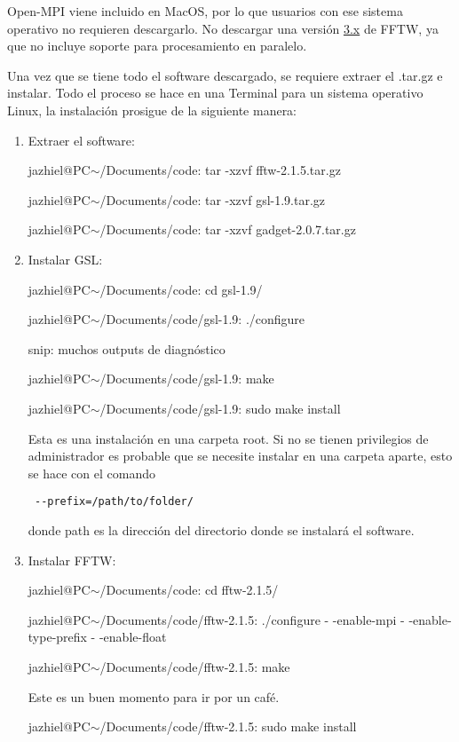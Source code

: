 \documentclass[a4paper,openright,12pt]{book}
\begin{document}
\textsf{Open-MPI} viene incluido en MacOS, por lo que usuarios con ese sistema operativo no requieren descargarlo. No descargar una versión \underline{3.x} de FFTW, ya que no incluye soporte para procesamiento en paralelo.

Una vez que se tiene todo el software descargado, se requiere extraer el \textsf{.tar.gz} e instalar. Todo el proceso se hace en una Terminal para un sistema operativo Linux, la instalación prosigue de la siguiente manera:
\begin{enumerate}
\item Extraer el software:

\textsf{jazhiel@PC$\sim$/Documents/code: tar -xzvf fftw-2.1.5.tar.gz}

\textsf{jazhiel@PC$\sim$/Documents/code: tar -xzvf gsl-1.9.tar.gz}

\textsf{jazhiel@PC$\sim$/Documents/code: tar -xzvf gadget-2.0.7.tar.gz}

\item Instalar GSL:

\textsf{jazhiel@PC$\sim$/Documents/code: cd gsl-1.9/}

\textsf{jazhiel@PC$\sim$/Documents/code/gsl-1.9: ./configure}

\textsf{snip: muchos outputs de diagnóstico}

\textsf{jazhiel@PC$\sim$/Documents/code/gsl-1.9: make}

\textsf{jazhiel@PC$\sim$/Documents/code/gsl-1.9: sudo make install}

Esta es una instalación en una carpeta \textsf{root}. Si no se tienen privilegios de administrador es probable que se necesite instalar en una carpeta aparte, esto se hace con el comando \begin{verbatim} --prefix=/path/to/folder/
\end{verbatim}  donde \textsf{path} es la dirección del directorio donde se instalará el software.

\item Instalar FFTW:

\textsf{jazhiel@PC$\sim$/Documents/code: cd fftw-2.1.5/}

\textsf{jazhiel@PC$\sim$/Documents/code/fftw-2.1.5: ./configure - -enable-mpi - -enable-type-prefix - -enable-float}

\textsf{jazhiel@PC$\sim$/Documents/code/fftw-2.1.5: make}

\textsf{Este es un buen momento para ir por un café.}

\textsf{jazhiel@PC$\sim$/Documents/code/fftw-2.1.5: sudo make install}


\end{enumerate}
\end{document}
